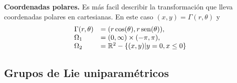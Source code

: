 \begin{ejemplo}{} \textbf{Coordenadas polares.} Es más facil describir la transformación que lleva coordenadas polares en cartesianas. En este caso $(x,y)=\Gamma(r,\theta)$ y
\[
\begin{array}{ll}
\Gamma(r,\theta)&=(r\cos(\theta),r\operatorname{sen}(\theta)),\\
\Omega_1&=(0,\infty)\times (-\pi,\pi),\\
\Omega_2&=\mathbb{R}^2-\{(x,y)|y=0,x\leq 0\}\\
\end{array}
\]
\end{ejemplo}

\subsection{Grupos de Lie uniparamétricos}

